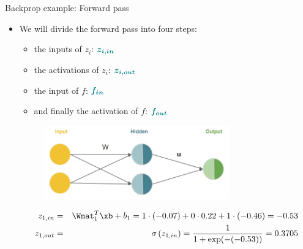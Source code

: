 \begin{vbframe}{Backprop example: Forward pass}

\begin{itemize}
\item We will divide the forward pass into four steps:
\begin{itemize}
\item the inputs of $z_i$: $\bm{\textcolor{teal}{z_{i,in}}}$
\item the activations of $z_i$: $\bm{\textcolor{teal}{z_{i,out}}}$
\item the input of $f$: $\bm{\textcolor{teal}{f_{in}}}$
\item and finally the activation of $f$: $\bm{\textcolor{teal}{f_{out}}}$
\end{itemize}
\begin{figure}
\centering
\includegraphics[width=8cm]{figure/xor_rep.png}
\end{figure}
\begin{figure}
\centering
{}
\end{figure}
\begin{footnotesize}
\begin{eqnarray*}
z_{1,in} &=& \Wmat_1^T \xb + b_1 =  1 \cdot (-0.07) + 0 \cdot 0.22 + 1 \cdot (-0.46) = -0.53 \\
z_{1,out} &=& \sigma\left(z_{1,in}\right) = \frac{1}{1+\exp(-(-0.53))} = \num[round-mode=places,round-precision=4]{0.3705169}
\end{eqnarray*}
\end{footnotesize}
\end{itemize}
\framebreak


\end{vbframe}

